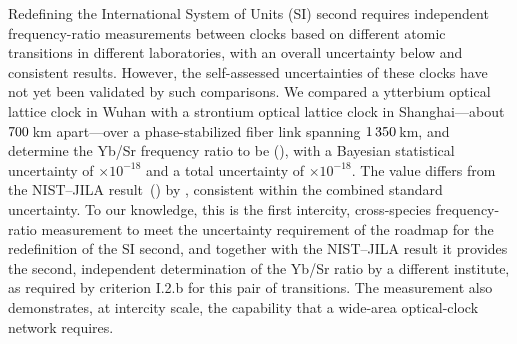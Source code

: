 Redefining the International System of Units (SI) second requires
independent frequency-ratio measurements between clocks based on
different atomic transitions in different laboratories, with an
overall uncertainty below  and consistent results. However, the
self-assessed uncertainties of these clocks have not yet been validated
by such comparisons. We compared a ytterbium optical lattice clock in
Wuhan with a strontium optical lattice clock in Shanghai---about
$700$\,km apart---over a phase-stabilized fiber link spanning
$1\thinspace350$\,km, and determine the Yb/Sr frequency ratio to be
\Rheadline(\RheadlineUnc), with a Bayesian statistical uncertainty of
\uStatShort$\times10^{-18}$ and a total uncertainty of
\uTotalE$\times10^{-18}$. The value differs from the NIST--JILA
result~() by \dVsNistE{}, consistent within the
combined standard uncertainty. To our knowledge, this is the first
intercity, cross-species frequency-ratio measurement to meet the
uncertainty requirement of the roadmap for the redefinition of the SI
second, and together with the NIST--JILA result it provides the
second, independent determination of the Yb/Sr ratio by a different
institute, as required by criterion I.2.b for this pair of
transitions. The measurement also demonstrates, at intercity scale,
the capability that a wide-area optical-clock network requires.